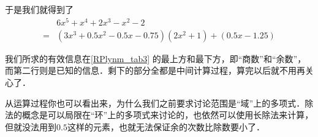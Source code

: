 于是我们就得到了
\begin{equation}
\begin{aligned}
&6x^5+x^4+2x^3-x^2-2 \\
= &(3x^3+0.5x^2-0.5x-0.75)(2x^2+1)+(0.5x-1.25)
\end{aligned}
\end{equation}

我们所求的有效信息在\autoref{RPlynm_tab3} 的最上方和最下方，即“商数”和“余数”，而第二行则是已知的信息．剩下的部分全都是中间计算过程，算完以后就不用再关心了．

从运算过程你也可以看出来，为什么我们之前要求讨论范围是“域”上的多项式．除法的概念是可以局限在“环”上的多项式来讨论的，也依然可以使用长除法来计算，但就没法用到$0.5$这样的元素，也就无法保证余的次数比除数要小了．


















